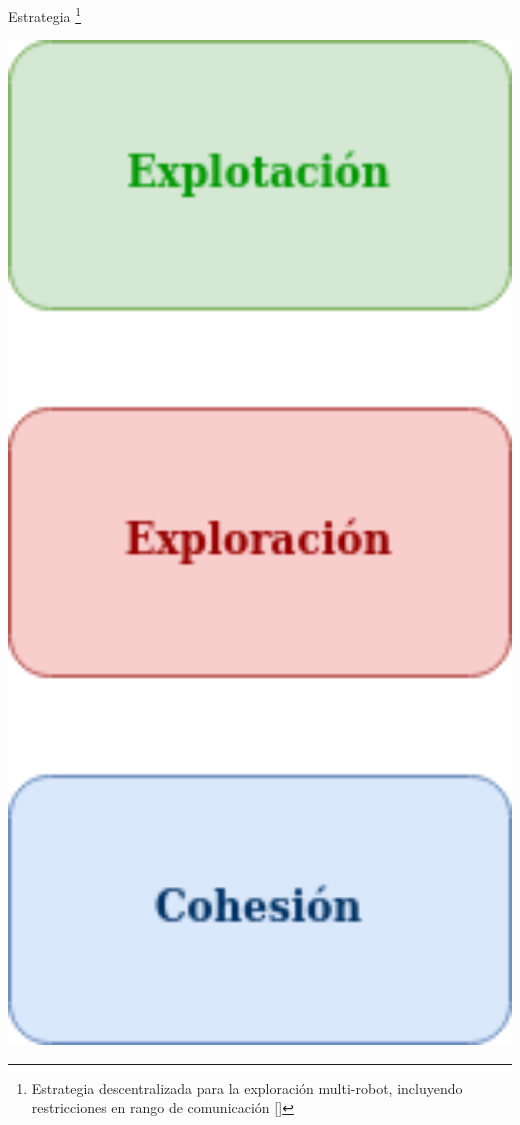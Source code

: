 \documentclass[
  24pt, %
  aspectratio=169, %
]{beamer}
\begin{document}
\begin{frame}{Estrategia \footnote{Estrategia descentralizada para la exploración multi-robot, incluyendo restricciones en rango de comunicación [\cite{LEAL2013}]}}
\begin{minipage}{0.2\textwidth}
    \includegraphics[width=1\textwidth]{estrategia}
  \end{minipage}
  
\end{frame}
\end{document}
